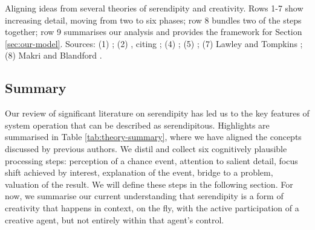 \begin{table}
{\par}
\caption{Aligning ideas from several theories of serendipity and
  creativity.  Rows 1-7 show increasing detail, moving from two to six
  phases; row 8 bundles two of the steps together; row 9 summarises our
  analysis and
  provides the framework for Section \ref{sec:our-model}. Sources: (1) 
 \citet{andre2009discovery}; (2) \citet{mckay-serendipity}, citing \citet{bergson1946creative}; (4) \citet{Allen:2013:LOD:2655780.2655790}; (5) \citet{merton1948bearing}; (7) Lawley and Tompkins \cite{lawley2008maximising}; (8) Makri and
  Blandford \cite{Makri2012a}. \label{tab:theory-summary}}
\end{table}


\subsection{Summary} \label{sec:literature-summary}

Our review of significant literature on serendipity has led us to the
key features of system operation that can be described as
serendipitous.  Highlights are summarised in Table
\ref{tab:theory-summary}, where we have aligned the concepts discussed
by previous authors.  We distil and collect six cognitively plausible
processing steps: perception of a chance event, attention to salient
detail, focus shift achieved by interest, explanation of the event,
bridge to a problem, valuation of the result.  We will define these
steps in the following section.  For now, we summarise our current
understanding that serendipity is a form of creativity that happens in
context, on the fly, with the active participation of a creative
agent, but not entirely within that agent's control.

